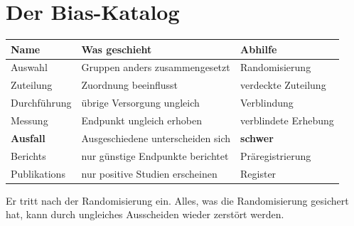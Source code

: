 \section{Der Bias-Katalog}

\begin{merksatz}
\begin{center}
{\small
\renewcommand{\arraystretch}{1.5}
\begin{tabular}{@{}P{2.4cm}P{3.0cm}P{2.6cm}@{}}
\toprule
\textbf{Name} & \textbf{Was geschieht} & \textbf{Abhilfe}\\
\midrule
Auswahl & Gruppen anders zusammen\-gesetzt & Randomisierung\\
Zuteilung & Zuordnung beeinflusst & verdeckte Zuteilung\\
Durchführung & übrige Versorgung ungleich & Verblindung\\
Messung & Endpunkt ungleich erhoben & verblindete Erhebung\\
\textbf{Ausfall} & Ausgeschiedene unterscheiden sich & \textcolor{akzent}{\textbf{schwer}}\\
Berichts & nur günstige Endpunkte berichtet & Prä\-registrierung\\
Publikations & nur positive Studien erscheinen & Register\\
\bottomrule
\end{tabular}}
\end{center}

Er tritt nach der Randomisierung ein. Alles, was die Randomisierung gesichert hat, kann durch ungleiches Ausscheiden wieder zerstört werden.

\begin{center}
\begin{minipage}{0.88\textwidth}
\end{minipage}
\end{center}
\end{merksatz}

